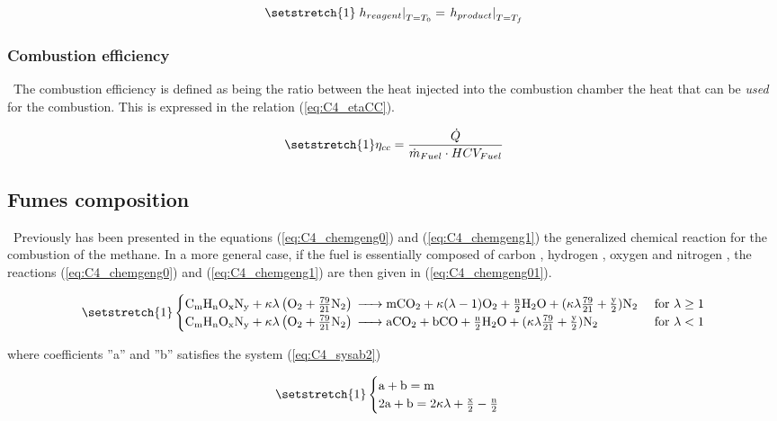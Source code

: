 \begin{equation}
    \setstretch{1}
    \left.h_{reagent}\right|_{T=T_0} = \left.h_{product}\right|_{T=T_f}\label{eq:C4_T_f}
\end{equation}

\subsubsection{Combustion efficiency}
\quad\ The combustion efficiency is defined as being the ratio between the heat injected into the combustion chamber the heat that can be \textit{used} for the combustion. This is expressed in the relation (\ref{eq:C4_etaCC}).

\begin{equation}
    \setstretch{1}
    \eta_{cc} = \frac{\dot{Q}}{\dot{m}_{Fuel}\cdot HCV_{Fuel}}\label{eq:C4_etaCC}
\end{equation}
\subsection{Fumes composition}
\quad\ Previously has been presented in the equations (\ref{eq:C4_chemgeng0}) and (\ref{eq:C4_chemgeng1}) the generalized chemical reaction for the combustion of the methane.
In a more general case, if the fuel is essentially composed of carbon , hydrogen , oxygen  and nitrogen , the reactions (\ref{eq:C4_chemgeng0}) and (\ref{eq:C4_chemgeng1}) are then given in (\ref{eq:C4_chemgeng01}).

\begin{equation}
    \setstretch{1}
    \begin{cases}
        \ce{C_{\text{m}}H_{\text{n}}O_{\text{x}}N_{\text{y}} +}\kappa\lambda \left(\ce{O2}+\frac{79}{21}\ce{N2}\right) \ce{-> mCO2 +} \kappa(\lambda-1)\ce{O2 + \frac{n}{2}H2O +} (\kappa\lambda\frac{79}{21} + \frac{\text{y}}{2})\ce{N2} & \text{ for \(\lambda\geq 1\)} \\
        \ce{C_{\text{m}}H_{\text{n}}O_{\text{x}}N_{\text{y}} +}\kappa\lambda \left(\ce{O2}+\frac{79}{21}\ce{N2}\right) \ce{-> aCO2 + bCO + \frac{n}{2}H2O} + (\kappa\lambda\frac{79}{21} + \frac{\text{y}}{2})\ce{N2}                      & \text{ for \(\lambda< 1\)}
    \end{cases}\label{eq:C4_chemgeng01}
\end{equation}

where coefficients ''a'' and ''b'' satisfies the system (\ref{eq:C4_sysab2})

\begin{equation}
    \setstretch{1}
    \begin{cases}
        \text{a} + \text{b} = \text{m} \\
        2\text{a} + \text{b} = 2\kappa\lambda + \frac{\text{x}}{2} - \frac{\text{n}}{2}
    \end{cases}\label{eq:C4_sysab2}
\end{equation}

